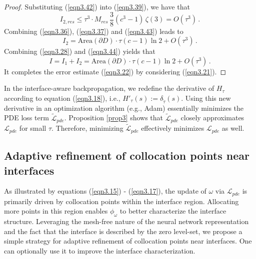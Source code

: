 \documentclass[final,hidelinks,onefignum,onetabnum]{siamart251216}
\begin{document}
\begin{proof}
Substituting (\ref{eqn3.42}) into (\ref{eqn3.39}), we have that
\begin{equation} \label{eqn3.43}
I_{2,res} \le \tau^3\cdot M_{res}\, \frac{3}{8}(c^3 - 1)\, \zeta(3) =O(\tau^3)\,.
\end{equation}
Combining (\ref{eqn3.36}), (\ref{eqn3.37}) and (\ref{eqn3.43}) leads to
\begin{equation}\label{eqn3.44}
I_2= \mathrm{Area}(\partial D)\cdot \tau(c-1) \ln 2 + O(\tau^3)\,.
\end{equation}
Combining (\ref{eqn3.28}) and (\ref{eqn3.44}) yields that
\begin{equation}
I=I_1+I_2=\mathrm{Area}(\partial D)\cdot \tau(c-1) \ln 2 + O(\tau^3)\,.
\end{equation}
It completes the error estimate (\ref{eqn3.22}) by considering (\ref{eqn3.21}).
\end{proof}

In the interface-aware backpropagation, we redefine the derivative of $H_\tau$ according to equation (\ref{eqn3.18}), i.e., $H'_\tau(s):=\delta_{\tilde{\tau}}(s)$. Using this new derivative in an optimization algorithm (e.g., Adam) essentially minimizes the PDE loss term $\tilde{\mathcal{L}}_{pde}$. Proposition \ref{prop3} shows that $\tilde{\mathcal{L}}_{pde}$ closely approximates $\mathcal{L}_{pde}$ for small $\tau$. Therefore, minimizing $\tilde{\mathcal{L}}_{pde}$ effectively minimizes $\mathcal{L}_{pde}$ as well.



\subsection{Adaptive refinement of collocation points near interfaces}
As illustrated by equations (\ref{eqn3.15}) - (\ref{eqn3.17}), the update of $\omega$ via $\mathcal{L}_{pde}$ is primarily driven by collocation points within the interface region. Allocating more points in this region enables $\phi_\omega$ to better characterize the interface structure. Leveraging the mesh-free nature of the neural network representation and the fact that the interface is described by the zero level-set, we propose a simple strategy for adaptive refinement of collocation points near interfaces. One can optionally use it to improve the interface characterization.
\end{document}
